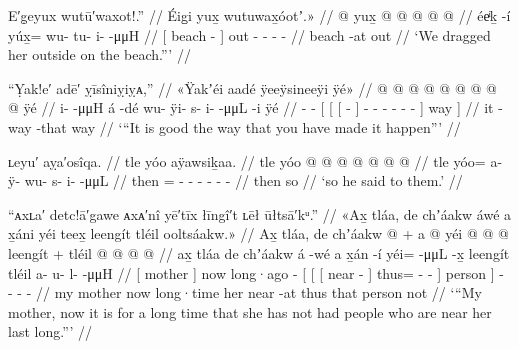 \ex\label{ex:92-144-drag-out-to-beach}%
%
\begingl
	\glpreamble	E′g̣eyux wutū′waxot!.” //
	\glpreamble	Éig̱i yux̱ wutuwax̱óotʼ.\!» //
	\gla	{}  @ {} {}
		yux̱ @  @ {} @ {} @ {} @ {} //
	\glb	{} éeͥḵ -í {}
		yúx̱= wu- tu- i-  -μμH //
	\glc	{}[ beach - {}]
		out - - -  - //
	\gld	{} beach -at {}
		out  {} {} {} {} //
	\glft	‘We dragged her outside on the beach.”’
		//
\endgl
\xe

\ex\label{ex:92-145-it-is-good-you-have-done}%
%
\begingl
	\glpreamble	“Ỵak!e′ adē′ ỵīsîniỵiỵᴀ,” //
	\glpreamble	«\!Ÿakʼéi aadé ÿeeÿsineeÿi ÿé\!» //
	\gla	{} @ {} @ {}
		{} {} {}  @ {} {}
			 @ {} @ {} @ {} @ {} @ {} @ {} {} ÿé {} //
	\glb	\pqp{}i-  -μμH
		{} {} {} á -dé {}
			wu- ÿi- s- i-  -μμL -i {} ÿé {} //
	\glc	\pqp{}-  -
		{}[ {}[ {}[  - {}]
			- - - -
				 - - {}] way {}] //
	\gld	\pqp{} {} {}
		{} {} {} it -way {}
			 {} {} {} {} {} -that
			{} way {}  //
	\glft	‘“It is good the way that you have made it happen”’
		//
\endgl
\xe

\ex\label{ex:92-146-so-said-to-them}%
%
\begingl
	\glpreamble	ʟeyu′ aỵa′osîqa. //
	\glpreamble	tle yóo aÿawsiḵaa. //
	\gla	tle yóo @  @ {} @ {} @ {} @ {} @ {} @ {} //
	\glb	tle yóo= a- ÿ- wu- s- i-  -μμL //
	\glc	then = - - - - -
			 - //
	\gld	then so  {} {} {} {} {} {} //
	\glft	‘so he said to them.’
		//
\endgl
\xe

\ex\label{ex:92-147-doesnt-make-last}%
%
\begingl
	\glpreamble	“ᴀxʟa′ detc!ā′gawe ᴀxᴀ′nî yē′tīx łīngî′t ʟēł ūłtsā′kᵘ.” //
	\glpreamble	«\!Ax̱ tláa, de chʼáakw áwé a x̱áni yéi teex̱ leengít tléil ooltsáakw.\!» //
	\gla	{} Ax̱ tláa, {} de chʼáakw  @ {} +
		{} {} {} a  @ {} {}
			yéi @  @ {} @ {} {} {} leengít {} +
		tléil  @ {} @ {} @ {} @ {} //
	\glb	{} ax̱ tláa {} de chʼáakw á -wé
		{} {} {} a x̱án -í {} 
			yéi=  -μμL -x̱ {} {} leengít {}
		tléil a- u- l-  -μμH //
	\glc	{}[  mother {}] now long·ago  -
		{}[ {}[ {}[  near - {}]
			thus=  - - \quad{}\· {}]
			person {}]
		 - - -  - //
	\gld	{} my mother {} now long·time  {}
		{} {} {} her near -at {}
			thus  {} {} \quad{}\·that {}
			person {}
		not  {} {} {} {} //
	\glft	‘“My mother, now it is for a long time that she has not had people who are near her last long.”’
		//
\endgl
\xe

